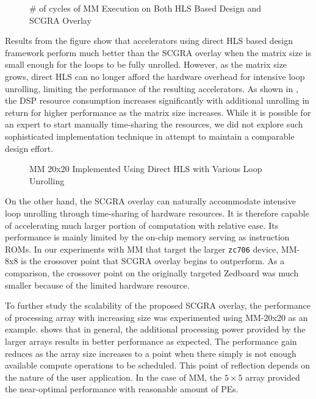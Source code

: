\begin{figure}
\centering
{}
\hfill
{}
\caption{\# of cycles of MM Execution on Both HLS Based Design and SCGRA Overlay}
\label{fig:mm-sim-perf}
\end{figure}

Results from the figure show that accelerators using direct HLS based design framework perform much better than the SCGRA overlay when the matrix size is small enough for the loops to be fully unrolled. However, as the matrix size grows, direct HLS can no longer afford the hardware overhead for intensive loop unrolling, limiting the performance of the resulting accelerators. As shown in , the DSP resource consumption increases significantly with additional unrolling in return for higher performance as the matrix size increases.  While it is possible for an expert to start manually time-sharing the resources, we did not explore such sophisticated implementation technique in attempt to maintain a comparable design effort.

\begin{figure}
\caption{MM 20x20 Implemented Using Direct HLS with Various Loop Unrolling}
\label{fig:loop-unroll-and-pipeline}
\end{figure}

On the other hand, the SCGRA overlay can naturally accommodate intensive loop unrolling through time-sharing of hardware resources. It is therefore capable of accelerating much larger portion of computation with relative ease. Its performance is mainly limited by the on-chip memory serving as instruction ROMs. In our experiments with MM that target the larger \texttt{zc706} device, MM-8x8 is the crossover point that SCGRA overlay begins to outperform.  As a comparison, the crossover point on the originally targeted Zedboard was much smaller because of the limited hardware resource.

To further study the scalability of the proposed SCGRA overlay, the performance of processing array with increasing size was experimented using MM-20x20 as an example.  shows that in general, the additional processing power provided by the larger arrays results in better performance as expected. The performance gain reduces as the array size increases to a point when there simply is not enough available compute operations to be scheduled. This point of reflection depends on the nature of the user application. In the case of MM, the $5 \times 5$ array provided the near-optimal performance with reasonable amount of PEs.

